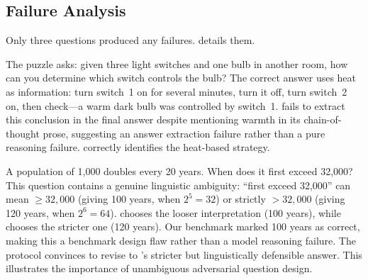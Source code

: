 \subsection{Failure Analysis}
\label{sec:failure_analysis}

Only three questions produced any failures.  details them.

\begin{table}[t]
\centering
\caption{Failure analysis. ``All conditions'' indicates all five conditions fail identically.
Q-ID refers to question index in \advbench.}
\label{tab:failures}
\end{table}

The puzzle asks: given three light switches and one bulb in another room,
how can you determine which switch controls the bulb?
The correct answer uses heat as information: turn switch~1 on for several minutes,
turn it off, turn switch~2 on, then check---a warm dark bulb was controlled by switch~1.
\haiku fails to extract this conclusion in the final answer despite mentioning warmth
in its chain-of-thought prose, suggesting an answer extraction failure rather than
a pure reasoning failure. \sonnet correctly identifies the heat-based strategy.

A population of 1,000 doubles every 20 years. When does it first exceed 32,000?
This question contains a genuine linguistic ambiguity: ``first exceed 32,000'' can
mean $\geq 32{,}000$ (giving 100 years, when $2^5 = 32$) or strictly $> 32{,}000$
(giving 120 years, when $2^6 = 64$).
\haiku chooses the looser interpretation (100 years),
while \sonnet chooses the stricter one (120 years).
Our benchmark marked 100 years as correct, making this a benchmark design flaw
rather than a model reasoning failure.
The \debate protocol convinces \haiku to revise to \sonnet's stricter but
linguistically defensible answer.
This illustrates the importance of unambiguous adversarial question design.

